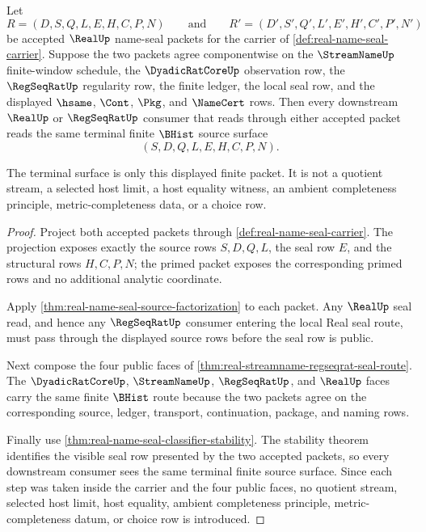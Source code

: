 \begin{theorem}
\label{thm:real-name-seal-terminal-source-uniqueness}
Let
$$
R=(D,S,Q,L,E,H,C,P,N)
\qquad\text{and}\qquad
R'=(D',S',Q',L',E',H',C',P',N')
$$
be accepted $\RealUp$ name-seal packets for the carrier of \autoref{def:real-name-seal-carrier}. Suppose the two packets agree componentwise on the $\StreamNameUp$ finite-window schedule, the $\DyadicRatCoreUp$ observation row, the $\RegSeqRatUp$ regularity row, the finite ledger, the local seal row, and the displayed $\hsame$, $\Cont$, $\Pkg$, and $\NameCert$ rows. Then every downstream $\RealUp$ or $\RegSeqRatUp$ consumer that reads through either accepted packet reads the same terminal finite $\BHist$ source surface
$$
(S,D,Q,L,E,H,C,P,N).
$$

The terminal surface is only this displayed finite packet. It is not a quotient stream, a selected host limit, a host equality witness, an ambient completeness principle, metric-completeness data, or a choice row.
\end{theorem}
\begin{proof}
Project both accepted packets through \autoref{def:real-name-seal-carrier}. The projection exposes exactly the source rows $S,D,Q,L$, the seal row $E$, and the structural rows $H,C,P,N$; the primed packet exposes the corresponding primed rows and no additional analytic coordinate.

Apply \autoref{thm:real-name-seal-source-factorization} to each packet. Any $\RealUp$ seal read, and hence any $\RegSeqRatUp$ consumer entering the local Real seal route, must pass through the displayed source rows before the seal row is public.

Next compose the four public faces of \autoref{thm:real-streamname-regseqrat-seal-route}. The $\DyadicRatCoreUp$, $\StreamNameUp$, $\RegSeqRatUp$, and $\RealUp$ faces carry the same finite $\BHist$ route because the two packets agree on the corresponding source, ledger, transport, continuation, package, and naming rows.

Finally use \autoref{thm:real-name-seal-classifier-stability}. The stability theorem identifies the visible seal row presented by the two accepted packets, so every downstream consumer sees the same terminal finite source surface. Since each step was taken inside the carrier and the four public faces, no quotient stream, selected host limit, host equality, ambient completeness principle, metric-completeness datum, or choice row is introduced.
\end{proof}

